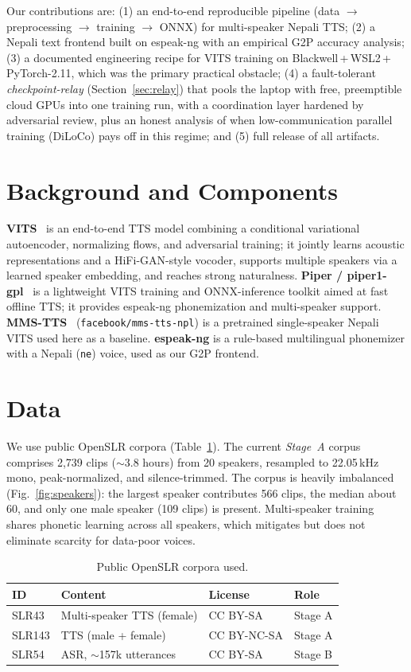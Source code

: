 \documentclass[conference]{IEEEtran}
\begin{document}
Our contributions are: (1) an end-to-end reproducible pipeline (data $\rightarrow$ preprocessing
$\rightarrow$ training $\rightarrow$ ONNX) for multi-speaker Nepali TTS; (2) a Nepali text frontend built on
espeak-ng with an empirical G2P accuracy analysis; (3) a documented engineering recipe for VITS training on
Blackwell\,+\,WSL2\,+\,PyTorch-2.11, which was the primary practical obstacle; (4) a fault-tolerant
\emph{checkpoint-relay} (Section~\ref{sec:relay}) that pools the laptop with free, preemptible cloud GPUs
into one training run, with a coordination layer hardened by adversarial review, plus an honest analysis of
when low-communication parallel training (DiLoCo) pays off in this regime; and (5) full release of all
artifacts.

\section{Background and Components}
\textbf{VITS}~\cite{vits} is an end-to-end TTS model combining a conditional variational autoencoder,
normalizing flows, and adversarial training; it jointly learns acoustic representations and a HiFi-GAN-style
vocoder, supports multiple speakers via a learned speaker embedding, and reaches strong naturalness.
\textbf{Piper / piper1-gpl}~\cite{piper} is a lightweight VITS training and ONNX-inference toolkit aimed at
fast offline TTS; it provides espeak-ng phonemization and multi-speaker support.
\textbf{MMS-TTS}~\cite{mms} (\texttt{facebook/mms-tts-npl}) is a pretrained single-speaker Nepali VITS used
here as a baseline. \textbf{espeak-ng} is a rule-based multilingual phonemizer with a Nepali (\texttt{ne})
voice, used as our G2P frontend.

\section{Data}
We use public OpenSLR corpora (Table~\ref{tab:data}). The current \emph{Stage~A} corpus comprises 2{,}739
clips ($\sim$3.8 hours) from 20 speakers, resampled to 22.05\,kHz mono, peak-normalized, and silence-trimmed.
The corpus is heavily imbalanced (Fig.~\ref{fig:speakers}): the largest speaker contributes 566 clips, the
median about 60, and only one male speaker (109 clips) is present. Multi-speaker training shares phonetic
learning across all speakers, which mitigates but does not eliminate scarcity for data-poor voices.

\begin{table}[t]
\caption{Public OpenSLR corpora used.}
\label{tab:data}
\centering
\begin{tabular}{@{}llll@{}}
\toprule
ID & Content & License & Role \\
\midrule
SLR43  & Multi-speaker TTS (female) & CC BY-SA      & Stage A \\
SLR143 & TTS (male + female)        & CC BY-NC-SA   & Stage A \\
SLR54  & ASR, $\sim$157k utterances & CC BY-SA      & Stage B \\
\bottomrule
\end{tabular}
\end{table}
\end{document}
